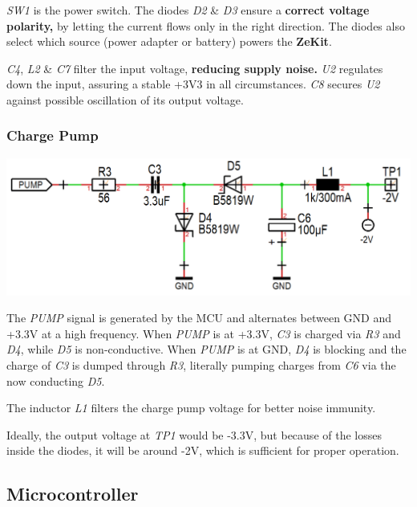 \documentclass{scrartcl}
\begin{document}
\emph{SW1} is the power switch. The diodes \emph{D2} \& \emph{D3} ensure a \textbf{correct voltage polarity,} by letting the current flows only in the right direction. The diodes also select which source (power adapter or battery) powers the \textbf{ZeKit}.

\emph{C4}, \emph{L2} \& \emph{C7} filter the input voltage, \textbf{reducing supply noise.} \emph{U2} regulates down the input, assuring a stable +3V3 in all circumstances. \emph{C8} secures \emph{U2} against possible oscillation of its output voltage.

\subsubsection{Charge Pump}

\begin{center}
    \includegraphics[scale=0.3]{assets/schema-pump.png}
\end{center}

The \emph{PUMP} signal is generated by the MCU and alternates between GND and +3.3V at a high frequency. When \emph{PUMP} is at +3.3V, \emph{C3} is charged via \emph{R3} and \emph{D4}, while \emph{D5} is non-conductive. When \emph{PUMP} is at GND, \emph{D4} is blocking and the charge of \emph{C3} is dumped through \emph{R3}, literally pumping charges from \emph{C6} via the now conducting \emph{D5}.

The inductor \emph{L1} filters the charge pump voltage for better noise immunity.

Ideally, the output voltage at \emph{TP1} would be -3.3V, but because of the losses inside the diodes, it will be around -2V, which is sufficient for proper operation.

\subsection{Microcontroller}
\end{document}
